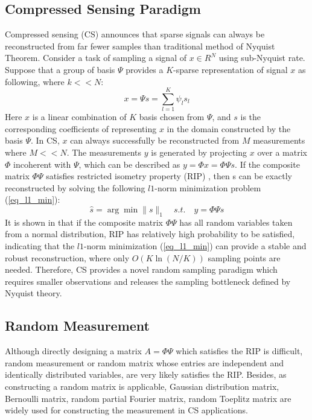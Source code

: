 \subsection{Compressed Sensing Paradigm}\label{sct:cs_paradigm}
Compressed sensing (CS) announces that sparse signals can always be reconstructed from far fewer samples than traditional method of Nyquist Theorem. Consider a task of sampling a signal of $x \in R^N$ using sub-Nyquist rate. Suppose that a group of basis $\Psi$ provides a $K$-sparse representation of signal $x$ as following,  where $k << N$:  
\begin{equation}
\label{eq_sparse}
x=\Psi s=\sum_{l=1}^{K}\psi_l s_l  
\end{equation}
Here $x$ is a linear combination of $K$ basis chosen from $\Psi$, and $s$ is the corresponding coefficients of representing $x$ in the domain constructed by the basis $\Psi$. In CS, $x$  can always successfully be reconstructed from $M$ measurements where $M << N$. The measurements $y$ is generated by projecting $x$ over a matrix $\Phi$ incoherent with $\Psi$, which can be described as $y = \Phi x = \Phi \Psi s$. If the composite matrix $\Phi \Psi$ satisfies restricted isometry property (RIP) \cite{candes2006robust}, then s can be exactly reconstructed by solving the following $l1$-norm minimization problem (\ref{eq_l1_min}):
\begin{equation}
\label{eq_l1_min}
\hat s = \arg\min \| s \|_1 \quad s.t. \quad  y = \Phi \Psi s
\end{equation} 
It is shown in \cite{baraniuk2007compressive} that if the composite matrix $\Phi \Psi$ has all random variables taken from a normal distribution, RIP has relatively high probability to be satisfied, indicating that the $l1$-norm minimization (\ref{eq_l1_min}) can provide a stable and robust reconstruction, where only $O(K\ln(N/K))$ sampling points are needed. Therefore, CS provides a novel random sampling paradigm which requires smaller observations and releases the sampling bottleneck defined by Nyquist theory.

\subsection{Random Measurement}
Although directly designing a matrix $A = \Phi \Psi$ which satisfies the RIP is difficult, random measurement or random matrix whose entries are independent and identically distributed variables, are very likely satisfies the RIP\cite{rauhut2010compressive}. Besides, as constructing a random matrix is  applicable, Gaussian distribution matrix, Bernoulli matrix, random partial Fourier matrix, random Toeplitz matrix\cite{bajwa2007toeplitz} are widely used for constructing the measurement in CS applications. 
 

